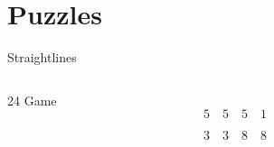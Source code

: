 \section{Puzzles}

\begin{frame}{Straightlines}
  \begin{columns}
    \pause
  \end{columns}
\end{frame}

\begin{frame}{24 Game}
  \[
    5 \quad 5 \quad 5 \quad 1
  \]

  \pause

  \[
    3 \quad 3 \quad 8 \quad 8 
  \]
\end{frame}
